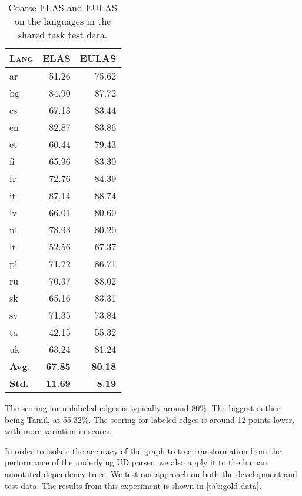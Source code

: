 \documentclass[11pt,a4paper]{article}
\begin{document}
\begin{table}[h]
	\centering
	\begin{tabular}{l|rr}
		\textsc{Lang} & \textsc{ELAS} & \textsc{EULAS} \\
		\hline
		ar  & 51.26 & 75.62 \\
		bg  & 84.90 & 87.72\\
		cs  & 67.13 & 83.44 \\
		en  & 82.87 & 83.86 \\
		et  & 60.44 & 79.43 \\
		fi  & 65.96 & 83.30 \\
		fr  & 72.76 & 84.39 \\
		it  & 87.14 & 88.74 \\
		lv  & 66.01 & 80.60 \\
		nl  & 78.93 & 80.20 \\
		lt  & 52.56 & 67.37 \\
		pl  & 71.22 & 86.71 \\
		ru  & 70.37 & 88.02 \\
		sk  & 65.16 & 83.31 \\
		sv  & 71.35 & 73.84 \\
		ta  & 42.15 & 55.32 \\
		uk  & 63.24 & 81.24 \\
		\textbf{Avg.} & \textbf{67.85} & \textbf{80.18} \\
        \textbf{Std.} & \textbf{11.69} & \textbf{8.19} \\
	\end{tabular}
\caption{\label{tab:test} Coarse ELAS and EULAS on the languages in the shared task test data.}
\end{table}

The scoring for unlabeled edges is typically around 80\%. The biggest
outlier being Tamil, at 55.32\%. The scoring for labeled edges is
around 12 points lower, with more variation in scores.

In order to isolate the accuracy of the graph-to-tree transformation
from the performance of the underlying UD parser, we also apply it to
the human annotated dependency trees. We test our approach on both the
development and test data. The results from this experiment is shown
in \cref{tab:gold-data}.
\end{document}
